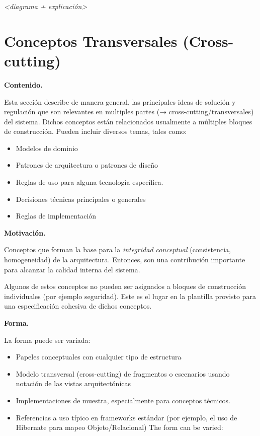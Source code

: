 \documentclass[]{article}
\begin{document}
\emph{\textless{}diagrama + explicación\textgreater{}}

\hypertarget{section-concepts}{%
\section{Conceptos Transversales
(Cross-cutting)}\label{section-concepts}}

\textbf{Contenido.}

Esta sección describe de manera general, las principales ideas de
solución y regulación que son relevantes en multiples partes (→
cross-cutting/transversales) del sistema. Dichos conceptos están
relacionados usualmente a múltiples bloques de construcción. Pueden
incluir diversos temas, tales como:

\begin{itemize}
\item
  Modelos de dominio
\item
  Patrones de arquitectura o patrones de diseño
\item
  Reglas de uso para alguna tecnología específica.
\item
  Decisiones técnicas principales o generales
\item
  Reglas de implementación
\end{itemize}

\textbf{Motivación.}

Conceptos que forman la base para la \emph{integridad conceptual}
(consistencia, homogeneidad) de la arquitectura. Entonces, son una
contribución importante para alcanzar la calidad interna del sistema.

Algunos de estos conceptos no pueden ser asignados a bloques de
construcción individuales (por ejemplo seguridad). Este es el lugar en
la plantilla provisto para una especificación cohesiva de dichos
conceptos.

\textbf{Forma.}

La forma puede ser variada:

\begin{itemize}
\item
  Papeles conceptuales con cualquier tipo de estructura
\item
  Modelo transversal (cross-cutting) de fragmentos o escenarios usando
  notación de las vistas arquitectónicas
\item
  Implementaciones de muestra, especialmente para conceptos técnicos.
\item
  Referencias a uso típico en frameworks estándar (por ejemplo, el uso
  de Hibernate para mapeo Objeto/Relacional) The form can be varied:
\end{itemize}
\end{document}
